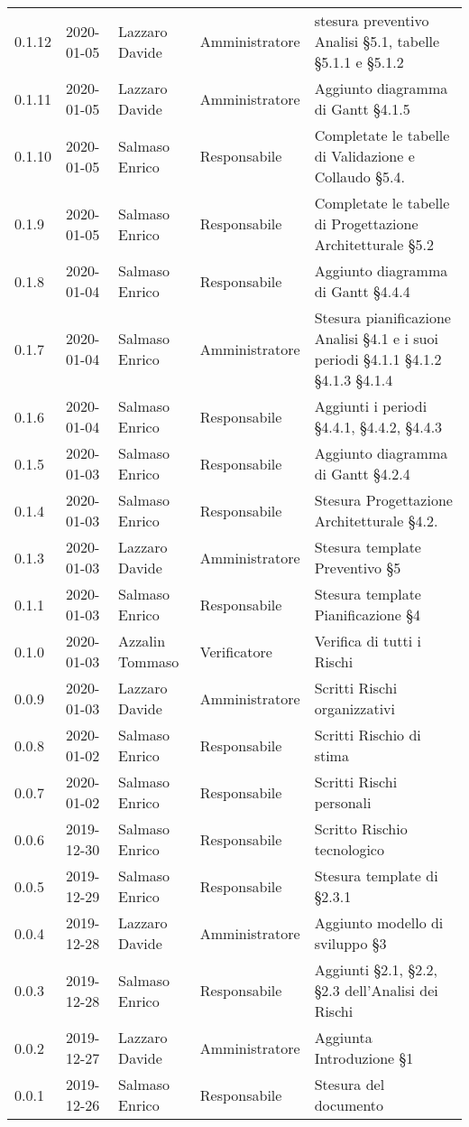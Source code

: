 {\begin{longtable}{C{2cm} C{2cm}  C{3cm}  C{3cm} C{4.5cm}}
0.1.12 & 2020-01-05 & Lazzaro Davide & Amministratore & stesura preventivo Analisi §5.1, tabelle §5.1.1 e §5.1.2 \\
0.1.11 & 2020-01-05 & Lazzaro Davide & Amministratore & Aggiunto diagramma di Gantt §4.1.5 \\
0.1.10 & 2020-01-05 & Salmaso Enrico & Responsabile & Completate le tabelle di Validazione e Collaudo §5.4.\\
0.1.9 & 2020-01-05 & Salmaso Enrico & Responsabile & Completate le tabelle di Progettazione Architetturale §5.2\\
0.1.8 & 2020-01-04 & Salmaso Enrico & Responsabile & Aggiunto diagramma di Gantt §4.4.4 \\
0.1.7 & 2020-01-04 & Salmaso Enrico & Amministratore & Stesura pianificazione Analisi §4.1 e i suoi periodi §4.1.1 §4.1.2 §4.1.3 §4.1.4 \\
0.1.6 & 2020-01-04 & Salmaso Enrico & Responsabile & Aggiunti i periodi §4.4.1, §4.4.2, §4.4.3\\
0.1.5 & 2020-01-03 & Salmaso Enrico & Responsabile & Aggiunto diagramma di Gantt §4.2.4\\
0.1.4 & 2020-01-03 & Salmaso Enrico & Responsabile & Stesura Progettazione Architetturale §4.2.\\
0.1.3 & 2020-01-03 & Lazzaro Davide & Amministratore & Stesura template Preventivo §5\\
0.1.1 & 2020-01-03 & Salmaso Enrico & Responsabile & Stesura template Pianificazione §4\\
0.1.0 & 2020-01-03 & Azzalin Tommaso & Verificatore & Verifica di tutti i Rischi  \\
0.0.9 & 2020-01-03 & Lazzaro Davide & Amministratore & Scritti Rischi organizzativi \\
0.0.8 & 2020-01-02 & Salmaso Enrico & Responsabile & Scritti Rischio di stima \\
0.0.7 & 2020-01-02 & Salmaso Enrico & Responsabile & Scritti Rischi personali \\
0.0.6 & 2019-12-30 & Salmaso Enrico & Responsabile & Scritto Rischio tecnologico \\
0.0.5 & 2019-12-29 & Salmaso Enrico & Responsabile & Stesura template di §2.3.1\\
0.0.4 & 2019-12-28 & Lazzaro Davide & Amministratore & Aggiunto modello di sviluppo §3\\
0.0.3 & 2019-12-28 & Salmaso Enrico & Responsabile & Aggiunti §2.1, §2.2, §2.3 dell'Analisi dei Rischi \\
0.0.2 & 2019-12-27 & Lazzaro Davide & Amministratore & Aggiunta Introduzione §1 \\
0.0.1 & 2019-12-26 & Salmaso Enrico & Responsabile & Stesura del documento  \\
		
\end{longtable}
}